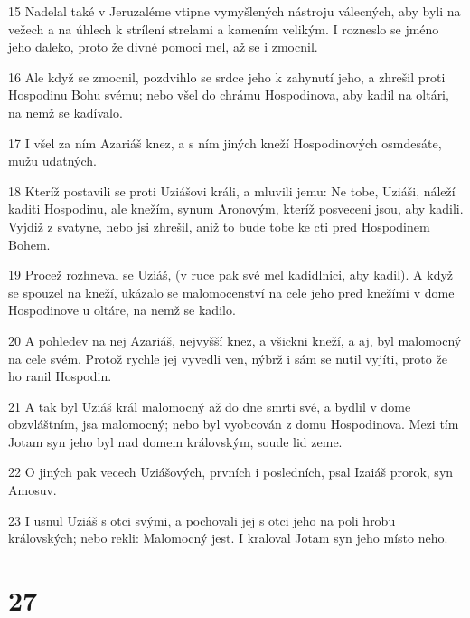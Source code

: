 \par 15 Nadelal také v Jeruzaléme vtipne vymyšlených nástroju válecných, aby byli na vežech a na úhlech k strílení strelami a kamením velikým. I rozneslo se jméno jeho daleko, proto že divné pomoci mel, až se i zmocnil.
\par 16 Ale když se zmocnil, pozdvihlo se srdce jeho k zahynutí jeho, a zhrešil proti Hospodinu Bohu svému; nebo všel do chrámu Hospodinova, aby kadil na oltári, na nemž se kadívalo.
\par 17 I všel za ním Azariáš knez, a s ním jiných kneží Hospodinových osmdesáte, mužu udatných.
\par 18 Kteríž postavili se proti Uziášovi králi, a mluvili jemu: Ne tobe, Uziáši, náleží kaditi Hospodinu, ale knežím, synum Aronovým, kteríž posveceni jsou, aby kadili. Vyjdiž z svatyne, nebo jsi zhrešil, aniž to bude tobe ke cti pred Hospodinem Bohem.
\par 19 Procež rozhneval se Uziáš, (v ruce pak své mel kadidlnici, aby kadil). A když se spouzel na kneží, ukázalo se malomocenství na cele jeho pred knežími v dome Hospodinove u oltáre, na nemž se kadilo.
\par 20 A pohledev na nej Azariáš, nejvyšší knez, a všickni kneží, a aj, byl malomocný na cele svém. Protož rychle jej vyvedli ven, nýbrž i sám se nutil vyjíti, proto že ho ranil Hospodin.
\par 21 A tak byl Uziáš král malomocný až do dne smrti své, a bydlil v dome obzvláštním, jsa malomocný; nebo byl vyobcován z domu Hospodinova. Mezi tím Jotam syn jeho byl nad domem královským, soude lid zeme.
\par 22 O jiných pak vecech Uziášových, prvních i posledních, psal Izaiáš prorok, syn Amosuv.
\par 23 I usnul Uziáš s otci svými, a pochovali jej s otci jeho na poli hrobu královských; nebo rekli: Malomocný jest. I kraloval Jotam syn jeho místo neho.

\chapter{27}

